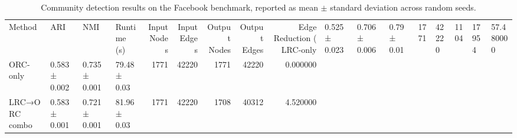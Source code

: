 \begin{table}
\caption{Community detection results on the Facebook benchmark, reported as mean $\pm$ standard deviation across random seeds.}
\label{tab:facebook_results}
\begin{tabular}{llllrrrrr}
\toprule
Method & ARI & NMI & Runtime (s) & Input Nodes & Input Edges & Output Nodes & Output Edges & Edge Reduction (%
\midrule
LRC-only & 0.525 ± 0.023 & 0.706 ± 0.006 & 0.79 ± 0.01 & 1771 & 42220 & 1104 & 17954 & 57.480000 \\
ORC-only & 0.583 ± 0.002 & 0.735 ± 0.001 & 79.48 ± 0.03 & 1771 & 42220 & 1771 & 42220 & 0.000000 \\
LRC→ORC combo & 0.583 ± 0.001 & 0.721 ± 0.001 & 81.96 ± 0.03 & 1771 & 42220 & 1708 & 40312 & 4.520000 \\
\bottomrule
\end{tabular}
\end{table}

